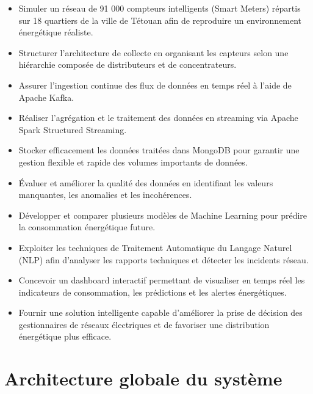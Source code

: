 \documentclass[1pt,a4paper]{report}
\begin{document}
\begin{itemize}
    \item Simuler un réseau de 91 000 compteurs intelligents (Smart Meters) répartis sur 18 quartiers de la ville de Tétouan afin de reproduire un environnement énergétique réaliste.
    
    \item Structurer l’architecture de collecte en organisant les capteurs selon une hiérarchie composée de distributeurs et de concentrateurs.
    
    \item Assurer l’ingestion continue des flux de données en temps réel à l’aide de Apache Kafka.
    
    \item Réaliser l’agrégation et le traitement des données en streaming via Apache Spark Structured Streaming.
    
    \item Stocker efficacement les données traitées dans MongoDB pour garantir une gestion flexible et rapide des volumes importants de données.
    
    \item Évaluer et améliorer la qualité des données en identifiant les valeurs manquantes, les anomalies et les incohérences.
    
    \item Développer et comparer plusieurs modèles de Machine Learning pour prédire la consommation énergétique future.
    
    \item Exploiter les techniques de Traitement Automatique du Langage Naturel (NLP) afin d’analyser les rapports techniques et détecter les incidents réseau.
    
    \item Concevoir un dashboard interactif permettant de visualiser en temps réel les indicateurs de consommation, les prédictions et les alertes énergétiques.
    
    \item Fournir une solution intelligente capable d’améliorer la prise de décision des gestionnaires de réseaux électriques et de favoriser une distribution énergétique plus efficace.
\end{itemize}

\chapter{Architecture globale du système}
\end{document}
